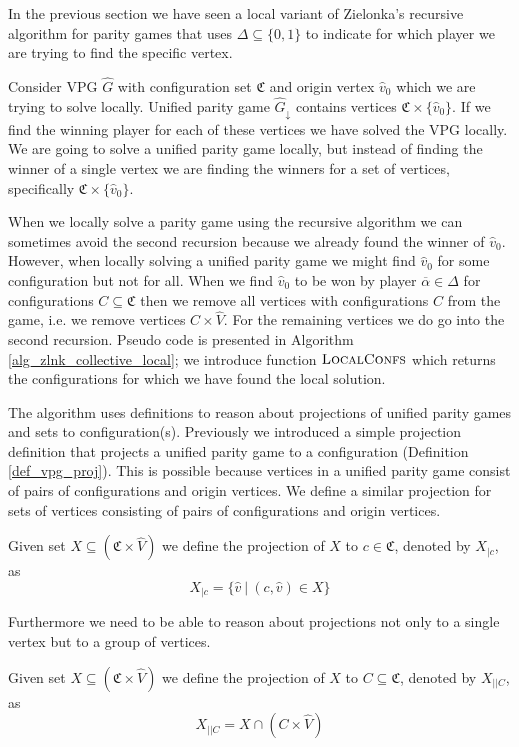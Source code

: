 In the previous section we have seen a local variant of Zielonka's recursive algorithm for parity games that uses $\Delta \subseteq \{0,1\}$ to indicate for which player we are trying to find the specific vertex.

Consider VPG $\hat{G}$ with configuration set $\mathfrak{C}$ and origin vertex $\hat{v}_0$ which we are trying to solve locally. Unified parity game $\hat{G}_{\downarrow}$ contains vertices $\mathfrak{C} \times \{\hat{v}_0\}$. If we find the winning player for each of these vertices we have solved the VPG locally. We are going to solve a unified parity game locally, but instead of finding the winner of a single vertex we are finding the winners for a set of vertices, specifically $\mathfrak{C} \times \{\hat{v}_0\}$.

When we locally solve a parity game using the recursive algorithm we can sometimes avoid the second recursion because we already found the winner of $\hat{v}_0$. However, when locally solving a unified parity game we might find $\hat{v}_0$ for some configuration but not for all. When we find $\hat{v}_0$ to be won by player $\overline{\alpha} \in \Delta$ for configurations $C \subseteq \mathfrak{C}$ then we remove all vertices with configurations $C$ from the game, i.e. we remove vertices $C \times \hat{V}$. For the remaining vertices we do go into the second recursion. Pseudo code is presented in Algorithm \ref{alg_zlnk_collective_local}; we introduce function $\textsc{LocalConfs}$ which returns the configurations for which we have found the local solution.

The algorithm uses definitions to reason about projections of unified parity games and sets to configuration(s). Previously we introduced a simple projection definition that projects a unified parity game to a configuration (Definition \ref{def_vpg_proj}). This is possible because vertices in a unified parity game consist of pairs of configurations and origin vertices. We define a similar projection for sets of vertices consisting of pairs of configurations and origin vertices.
\begin{definition}
	Given set $X \subseteq (\mathfrak{C} \times \hat{V})$ we define the projection of $X$ to $c \in \mathfrak{C}$, denoted by $X_{|c}$, as
	\[ X_{|c} = \{ \hat{v}\ |\ (c,\hat{v}) \in X \} \]
\end{definition}
Furthermore we need to be able to reason about projections not only to a single vertex but to a group of vertices. 
\begin{definition}
	Given set $X \subseteq (\mathfrak{C} \times \hat{V})$ we define the projection of $X$ to $C \subseteq \mathfrak{C}$, denoted by $X_{||C}$, as
	\[ X_{||C} = X \cap (C \times \hat{V}) \]
\end{definition}

